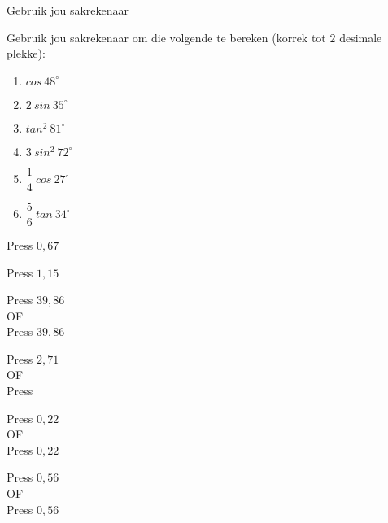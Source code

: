 \begin{wex}{Gebruik jou sakrekenaar}

 {\begin{minipage}{\textwidth} Gebruik jou sakrekenaar om die volgende te bereken (korrek tot $2$ desimale plekke):
\begin{enumerate}[itemsep=4pt, label=\textbf{\arabic*}. ] 
 \item $cos~48^{\circ}$
\item $2~sin~35^{\circ}$
\item $tan^{2}~81^{\circ}$
\item $3~sin^{2}~72^{\circ}$
\item $\dfrac{1}{4}~cos~27^{\circ} $
\item $\dfrac{5}{6}~tan~34^{\circ}$
\end{enumerate}
\end{minipage}
}
{

\westep{}
Press   \fbox{\LARGE =} $0,67$

\westep{}
Press    \fbox{\LARGE =} $1,15$

\westep{}
Press \fbox{(}   \fbox{)}   \fbox{\LARGE =} $39,86$
\\
OF\\
Press   \fbox{\LARGE =}   \fbox{\LARGE =} $39,86$

\westep{}
Press  \fbox{(}   \fbox{)}  \fbox{\LARGE =} $2,71$
\\
OF\\
Press   \fbox{\LARGE =}   \fbox{\LARGE =}  \fbox{$\times$} 

\westep{}
Press \fbox{(}  \fbox{$\div$}  \fbox{)}   \fbox{\LARGE =} $0,22$
\\
OF\\
Press   \fbox{\LARGE =}  \fbox{$\div$}  \fbox{\LARGE =} $0,22$

\westep{}
Press \fbox{(}  \fbox{$\div$}  \fbox{)}   \fbox{\LARGE =} $0,56$
\\
OF\\
Press   \fbox{\LARGE =}  \fbox{$\times$}  \fbox{$\div$}  \fbox{\LARGE =} $0,56$
}
\end{wex}


